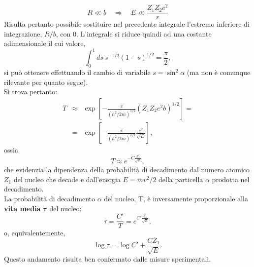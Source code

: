 \documentclass[a4paper,12pt,twoside]{book}
\begin{document}
\begin{equation}
R\ll b \quad \Rightarrow \quad E \ll \frac{Z_1 Z_2 e^2}{r}
\end{equation}
Risulta pertanto possibile sostituire nel precedente integrale l'estremo inferiore di integrazione, $R/b$, con $0$. L'integrale si riduce quindi ad una costante adimensionale il cui valore,
\begin{equation}
\int _{0} ^1 ds\ s^{-1/2} (1-s)^{1/2}= \frac{\pi}{2},
\end{equation}
si può ottenere effettuando il cambio di variabile $s= \sin^2 \alpha$ (ma non è comunque rilevante per quanto segue).\\
Si trova pertanto:
\begin{eqnarray}
T&\approx & \exp \left[ -\frac{\pi}{(\hbar ^2 /2m)^{1/2}}\left(Z_1 Z_2 e^2 b\right)^{1/2}\right]= \nonumber \\
&=&\exp \left[ -\frac{\pi}{(\hbar ^2 /2m)^{1/2}}\frac{e^2}{\sqrt{E}}\right],
\end{eqnarray}
ossia
\begin{equation}
T \approx e^{-C\frac{Z_1}{\sqrt{E}}},
\end{equation}
che evidenzia la dipendenza della probabilità di decadimento dal numero atomico $Z_1$ del nucleo che decade e dall'energia $E=mv^2/2$ della particella $\alpha$ prodotta nel decadimento.\\
La probabilità di decadimento $\alpha$ del nucleo, T, è inversamente proporzionale alla \textbf{vita media} $\mathbf{\tau}$ del nucleo:
\begin{equation}
\tau=\frac{C'}{T}=e^{C'\frac{Z_1}{\sqrt{E}}},
\end{equation}
o, equivalentemente,
\begin{equation}
\log \tau = \log C' + \frac{C Z_1}{\sqrt{E}}.
\end{equation}
Questo andamento risulta ben confermato dalle misure sperimentali.
\end{document}
